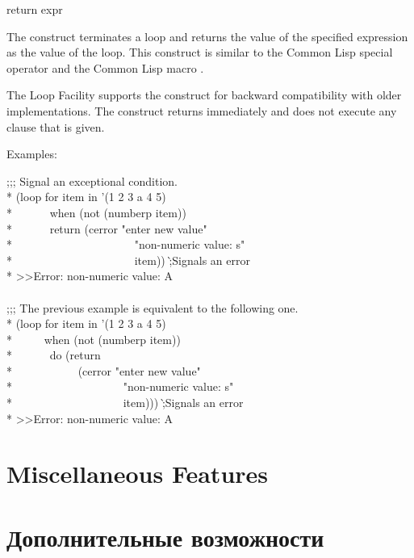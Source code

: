 \begin{defloop}
return expr

The  construct terminates a 
loop and returns the value of 
the specified expression as the value of the loop.   This construct
is similar to the Common Lisp special operator  and the
Common Lisp macro .

The Loop Facility supports the  construct for backward
compatibility with older  implementations.  
The  construct returns immediately and does not execute
any  clause that is given.

Examples:
\begin{lisp}
;;; Signal an exceptional condition. \\*
(loop for item in '(1 2 3 a 4 5) \\*
~~~~~~when (not (numberp item)) \\*
~~~~~~return (cerror "enter new value" \\*
~~~~~~~~~~~~~~~~~~~~~"non-numeric value: {\Xtilde}s" \\*
~~~~~~~~~~~~~~~~~~~~~item)) \`;\textrm{Signals an error} \\*
>>Error: non-numeric value: A \\
 \\
;;; The previous example is equivalent to the following one. \\*
(loop for item in '(1 2 3 a 4 5) \\*
~~~~~when (not (numberp item)) \\*
~~~~~~do (return  \\*
~~~~~~~~~~~(cerror "enter new value" \\*
~~~~~~~~~~~~~~~~~~~"non-numeric value: {\Xtilde}s" \\*
~~~~~~~~~~~~~~~~~~~item)))  \`;\textrm{Signals an error} \\*
>>Error: non-numeric value: A
\end{lisp}
\end{defloop}


\section{Miscellaneous Features}
\label{LOOP-MISC-SECTION}

\section{Дополнительные возможности}
\label{LOOP-MISC-SECTION}

